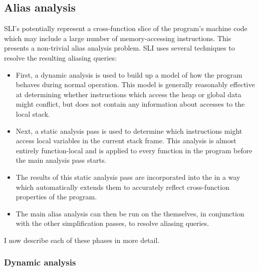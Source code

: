 
  
\subsection{Alias analysis}
\label{sect:alias_analysis}

SLI's {\StateMachines} potentially represent a cross-function slice of
the program's machine code which may include a large number of
memory-accessing instructions.  This presents a non-trivial alias
analysis problem.  SLI uses several techniques to resolve the
resulting aliasing queries:

\begin{itemize}
\item
  First, a dynamic analysis is used to build up a model of how the
  program behaves during normal operation.  This model is generally
  reasonably effective at determining whether instructions which
  access the heap or global data might conflict, but does not contain
  any information about accesses to the local stack.
\item
  Next, a static analysis pass is used to determine which instructions
  might access local variables in the current stack frame.  This
  analysis is almost entirely function-local and is applied to every
  function in the program before the main analysis pass
  starts.
\item
  The results of this static analysis pass are incorporated into the
  {\StateMachines} in a way which automatically extends them to
  accurately reflect cross-function properties of the program.
\item
  The main alias analysis can then be run on the {\StateMachines}
  themselves, in conjunction with the other {\StateMachine}
  simplification passes, to resolve aliasing queries.
\end{itemize}

I now describe each of these phases in more detail.

\subsubsection{Dynamic analysis}

